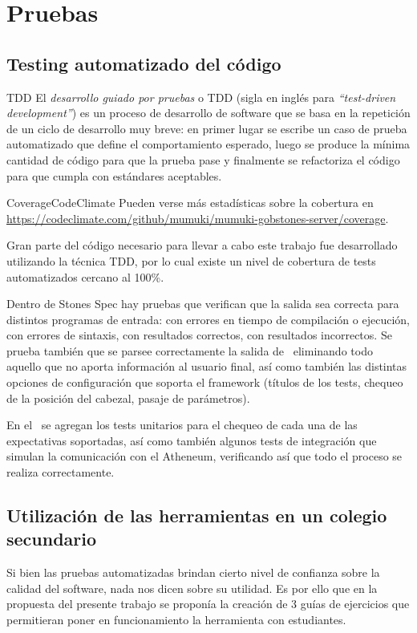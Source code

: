 
\section{Pruebas}
\subsection{Testing automatizado del código}

\sepfootnotecontent
  {TDD}
  {El \emph{desarrollo guiado por pruebas} o TDD (sigla en inglés para \textit{``test-driven development''}) es un proceso de desarrollo de software que se basa en la repetición de un ciclo de desarrollo muy breve: en primer lugar se escribe un caso de prueba automatizado que define el comportamiento esperado, luego se produce la mínima cantidad de código para que la prueba pase y finalmente se refactoriza el código para que cumpla con estándares aceptables.}

\sepfootnotecontent
  {CoverageCodeClimate}
  {Pueden verse más estadísticas sobre la cobertura en \url{https://codeclimate.com/github/mumuki/mumuki-gobstones-server/coverage}.}

Gran parte del código necesario para llevar a cabo este trabajo fue desarrollado utilizando la técnica TDD, por lo cual existe un nivel de cobertura de tests automatizados cercano al 100\%.

Dentro de Stones Spec hay pruebas que verifican que la salida sea correcta para distintos programas de entrada: con errores en tiempo de compilación o ejecución, con errores de sintaxis, con resultados correctos, con resultados incorrectos. Se prueba también que se parsee correctamente la salida de \pyGob\ eliminando todo aquello que no aporta información al usuario final, así como también las distintas opciones de configuración que soporta el framework (títulos de los tests, chequeo de la posición del cabezal, pasaje de parámetros).

En el \runner\ se agregan los tests unitarios para el chequeo de cada una de las expectativas soportadas, así como también algunos tests de integración que simulan la comunicación con el Atheneum, verificando así que todo el proceso se realiza correctamente.

\subsection{Utilización de las herramientas en un colegio secundario}
Si bien las pruebas automatizadas brindan cierto nivel de confianza sobre la calidad del software, nada nos dicen sobre su utilidad. Es por ello que en la propuesta del presente trabajo se proponía la creación de 3 guías de ejercicios que permitieran poner en funcionamiento la herramienta con estudiantes.


